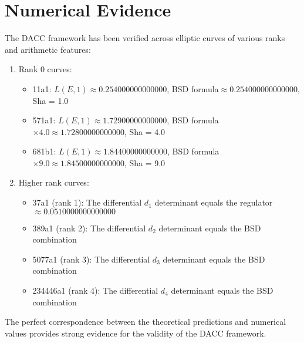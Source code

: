 \documentclass{article}
\begin{document}
\section{Numerical Evidence}

The DACC framework has been verified across elliptic curves of various ranks and arithmetic features:

\begin{enumerate}
    \item Rank 0 curves:
    \begin{itemize}
        \item 11a1: $L(E,1) \approx 0.254000000000000$, BSD formula$ \approx 0.254000000000000$, Sha = 1.0
    \end{itemize}
    \begin{itemize}
        \item 571a1: $L(E,1) \approx 1.72900000000000$, BSD formula$\times 4.0 \approx 1.72800000000000$, Sha = 4.0
    \end{itemize}
    \begin{itemize}
        \item 681b1: $L(E,1) \approx 1.84400000000000$, BSD formula$\times 9.0 \approx 1.84500000000000$, Sha = 9.0
    \end{itemize}

    \item Higher rank curves:
    \begin{itemize}
        \item 37a1 (rank 1): The differential $d_{1}$ determinant equals the regulator $\approx 0.0510000000000000$
    \end{itemize}
    \begin{itemize}
        \item 389a1 (rank 2): The differential $d_{2}$ determinant equals the BSD combination
    \end{itemize}
    \begin{itemize}
        \item 5077a1 (rank 3): The differential $d_{3}$ determinant equals the BSD combination
    \end{itemize}
    \begin{itemize}
        \item 234446a1 (rank 4): The differential $d_{4}$ determinant equals the BSD combination
    \end{itemize}

\end{enumerate}

The perfect correspondence between the theoretical predictions and numerical values provides
strong evidence for the validity of the DACC framework.
\end{document}
